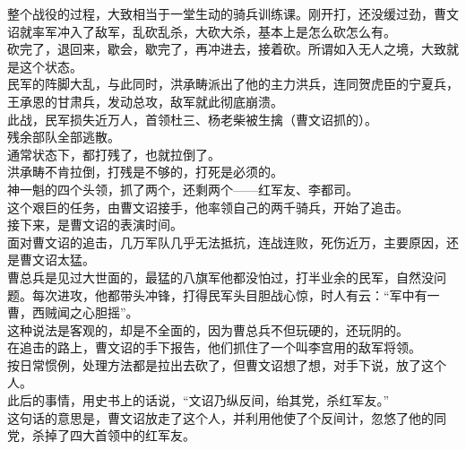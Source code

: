 \begin{multicols}{\theparacolNo}
整个战役的过程，大致相当于一堂生动的骑兵训练课。刚开打，还没缓过劲，曹文诏就率军冲入了敌军，乱砍乱杀，大砍大杀，基本上是怎么砍怎么有。\\

砍完了，退回来，歇会，歇完了，再冲进去，接着砍。所谓如入无人之境，大致就是这个状态。\\

民军的阵脚大乱，与此同时，洪承畴派出了他的主力洪兵，连同贺虎臣的宁夏兵，王承恩的甘肃兵，发动总攻，敌军就此彻底崩溃。\\

此战，民军损失近万人，首领杜三、杨老柴被生擒（曹文诏抓的）。\\

残余部队全部逃散。\\

通常状态下，都打残了，也就拉倒了。\\

洪承畴不肯拉倒，打残是不够的，打死是必须的。\\

神一魁的四个头领，抓了两个，还剩两个——红军友、李都司。\\

这个艰巨的任务，由曹文诏接手，他率领自己的两千骑兵，开始了追击。\\

接下来，是曹文诏的表演时间。\\

面对曹文诏的追击，几万军队几乎无法抵抗，连战连败，死伤近万，主要原因，还是曹文诏太猛。\\

曹总兵是见过大世面的，最猛的八旗军他都没怕过，打半业余的民军，自然没问题。每次进攻，他都带头冲锋，打得民军头目胆战心惊，时人有云：“军中有一曹，西贼闻之心胆摇”。\\

这种说法是客观的，却是不全面的，因为曹总兵不但玩硬的，还玩阴的。\\

在追击的路上，曹文诏的手下报告，他们抓住了一个叫李宫用的敌军将领。\\

按日常惯例，处理方法都是拉出去砍了，但曹文诏想了想，对手下说，放了这个人。\\

此后的事情，用史书上的话说，“文诏乃纵反间，绐其党，杀红军友。”\\

这句话的意思是，曹文诏放走了这个人，并利用他使了个反间计，忽悠了他的同党，杀掉了四大首领中的红军友。\\


\end{multicols}
